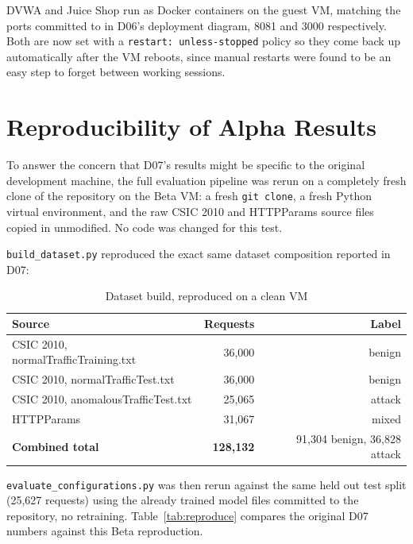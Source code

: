 \documentclass{llncs}
\begin{document}
DVWA and Juice Shop run as Docker containers on the guest VM, matching
the ports committed to in D06's deployment diagram, 8081 and 3000
respectively. Both are now set with a \texttt{restart: unless-stopped}
policy so they come back up automatically after the VM reboots, since
manual restarts were found to be an easy step to forget between working
sessions.

\clearpage
\section{Reproducibility of Alpha Results}
\label{sec:reproduce}

To answer the concern that D07's results might be specific to the
original development machine, the full evaluation pipeline was rerun on
a completely fresh clone of the repository on the Beta VM: a fresh
\texttt{git clone}, a fresh Python virtual environment, and the raw
CSIC 2010 and HTTPParams source files copied in unmodified. No code was
changed for this test.

\texttt{build\_dataset.py} reproduced the exact same dataset composition
reported in D07:

\begin{table}[h]
\centering
\caption{Dataset build, reproduced on a clean VM}
\begin{tabular}{lrr}
\toprule
\textbf{Source} & \textbf{Requests} & \textbf{Label} \\
\midrule
CSIC 2010, normalTrafficTraining.txt & 36{,}000 & benign \\
CSIC 2010, normalTrafficTest.txt & 36{,}000 & benign \\
CSIC 2010, anomalousTrafficTest.txt & 25{,}065 & attack \\
HTTPParams & 31{,}067 & mixed \\
\midrule
\textbf{Combined total} & \textbf{128{,}132} & 91{,}304 benign, 36{,}828 attack \\
\bottomrule
\end{tabular}
\end{table}

\texttt{evaluate\_configurations.py} was then rerun against the same
held out test split (25{,}627 requests) using the already trained model
files committed to the repository, no retraining. Table~\ref{tab:reproduce}
compares the original D07 numbers against this Beta reproduction.
\end{document}

